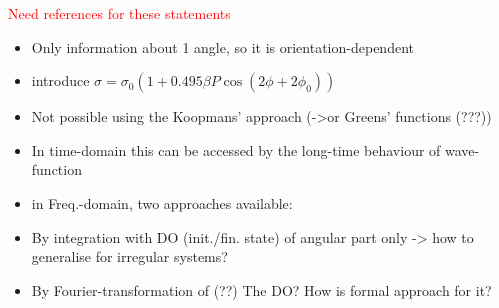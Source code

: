 \textcolor{red}{Need references for these statements}
\begin{itemize}
   \item Only information about 1 angle, so it is orientation-dependent
   \item introduce $\sigma=\sigma_0(1+0.495\beta P\cos(2\phi+2\phi_0))$ \cite{Li-R1}
   \item Not possible using the Koopmans' approach (->or Greens' functions (???))
   \item In time-domain this can be accessed by the long-time behaviour of wave-function
   \item in Freq.-domain, two approaches available:
   \item By integration with DO (init./fin. state) of angular part only -> how to generalise for irregular systems?
   \item By Fourier-transformation of (??) The DO? How is formal approach for it?
\end{itemize}
